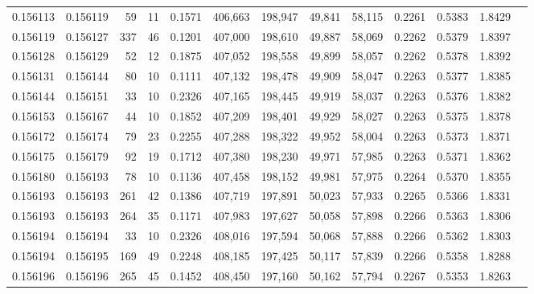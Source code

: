 \begin{tabular}{rrrrrrrrrrrrr}
0.156113 & 0.156119 &    59 &  11 &                                     0.1571 & 406,663 & 198,947 &  49,841 &  58,115 & 0.2261 & 0.5383 & 1.8429 \\
0.156119 & 0.156127 &   337 &  46 &                                     0.1201 & 407,000 & 198,610 &  49,887 &  58,069 & 0.2262 & 0.5379 & 1.8397 \\
0.156128 & 0.156129 &    52 &  12 &                                     0.1875 & 407,052 & 198,558 &  49,899 &  58,057 & 0.2262 & 0.5378 & 1.8392 \\
0.156131 & 0.156144 &    80 &  10 &                                     0.1111 & 407,132 & 198,478 &  49,909 &  58,047 & 0.2263 & 0.5377 & 1.8385 \\
0.156144 & 0.156151 &    33 &  10 &                                     0.2326 & 407,165 & 198,445 &  49,919 &  58,037 & 0.2263 & 0.5376 & 1.8382 \\
0.156153 & 0.156167 &    44 &  10 &                                     0.1852 & 407,209 & 198,401 &  49,929 &  58,027 & 0.2263 & 0.5375 & 1.8378 \\
0.156172 & 0.156174 &    79 &  23 &                                     0.2255 & 407,288 & 198,322 &  49,952 &  58,004 & 0.2263 & 0.5373 & 1.8371 \\
0.156175 & 0.156179 &    92 &  19 &                                     0.1712 & 407,380 & 198,230 &  49,971 &  57,985 & 0.2263 & 0.5371 & 1.8362 \\
0.156180 & 0.156193 &    78 &  10 &                                     0.1136 & 407,458 & 198,152 &  49,981 &  57,975 & 0.2264 & 0.5370 & 1.8355 \\
0.156193 & 0.156193 &   261 &  42 &                                     0.1386 & 407,719 & 197,891 &  50,023 &  57,933 & 0.2265 & 0.5366 & 1.8331 \\
0.156193 & 0.156193 &   264 &  35 &                                     0.1171 & 407,983 & 197,627 &  50,058 &  57,898 & 0.2266 & 0.5363 & 1.8306 \\
0.156194 & 0.156194 &    33 &  10 &                                     0.2326 & 408,016 & 197,594 &  50,068 &  57,888 & 0.2266 & 0.5362 & 1.8303 \\
0.156194 & 0.156195 &   169 &  49 &                                     0.2248 & 408,185 & 197,425 &  50,117 &  57,839 & 0.2266 & 0.5358 & 1.8288 \\
0.156196 & 0.156196 &   265 &  45 &                                     0.1452 & 408,450 & 197,160 &  50,162 &  57,794 & 0.2267 & 0.5353 & 1.8263 \\

\end{tabular}
